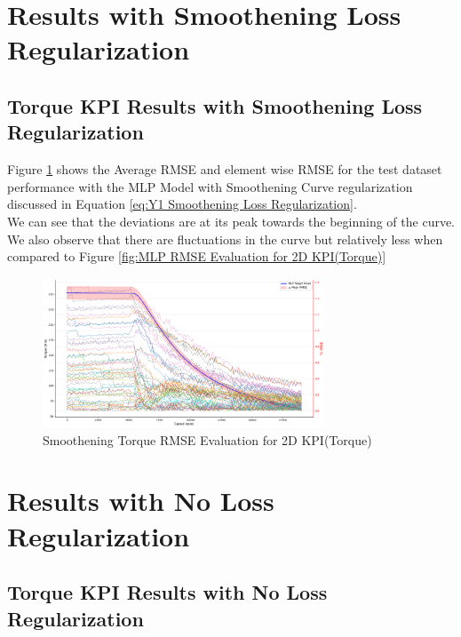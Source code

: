 \documentclass{report} %
\begin{document}
\section{Results with Smoothening Loss Regularization}\label{sec:Results with Smoothening Loss Regularization}

\subsection{Torque \ac{KPI} Results with Smoothening Loss Regularization}\label{subsec:2D Torque Results with Smoothening Loss Regularization}

Figure \ref{fig:Smoothening Torque RMSE Evaluation for 2D KPI(Torque)} shows the Average \ac{RMSE} and element wise \ac{RMSE} for the test dataset performance with the MLP Model with Smoothening Curve regularization discussed in Equation \ref{eq:Y1 Smoothening Loss Regularization}.\\
We can see that the deviations are at its peak towards the beginning of the curve. 
We also observe that there are fluctuations in the curve but relatively less when compared to Figure \ref{fig:MLP RMSE Evaluation for 2D KPI(Torque)}\\
\begin{figure}[H]
    \centering
    \includegraphics[width=0.75\textwidth]{./ReportImages/RMSE_MLP_Smoothening_y1.png} 
    \caption{Smoothening Torque \ac{RMSE} Evaluation for 2D KPI(Torque)} 
    \label{fig:Smoothening Torque RMSE Evaluation for 2D KPI(Torque)}
\end{figure}

\section{Results with No Loss Regularization}\label{sec:Results with No Loss Regularization}

\subsection{Torque \ac{KPI} Results with No Loss Regularization}\label{subsec:2D Torque Results with No Loss Regularization}
\end{document}

